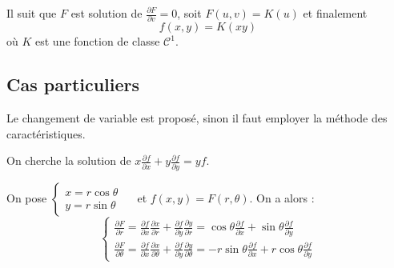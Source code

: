 \documentclass[12pt]{article}
\newcounter{exercice}
\begin{document}
Il suit que $F$ est solution de $\frac{\partial F}{\partial v} = 0$, soit $F(u, v) = K(u)$ et finalement
$$
f(x, y) = K(xy)
$$
où $K$ est une fonction de classe $\mathcal{C}^{1}$.

\subsection{Cas particuliers}

Le changement de variable est proposé, sinon il faut employer la méthode des caractéristiques.

\begin{exercice}
On cherche la solution de $x \frac{\partial f}{\partial x} + y \frac{\partial f}{\partial y} = yf$.
\end{exercice}

\begin{corrige}
On pose $\left\{\begin{array}{l}x = r \cos \theta \\ y = r \sin \theta\end{array} \quad\right.$ et $f(x, y) = F(r, \theta)$. On a alors :
$$
\left\{\begin{array}{l}
\frac{\partial F}{\partial r} = \frac{\partial f}{\partial x} \frac{\partial x}{\partial r} + \frac{\partial f}{\partial y} \frac{\partial y}{\partial r} = \cos \theta \frac{\partial f}{\partial x} + \sin \theta \frac{\partial f}{\partial y} \\
\frac{\partial F}{\partial \theta} = \frac{\partial f}{\partial x} \frac{\partial x}{\partial \theta} + \frac{\partial f}{\partial y} \frac{\partial y}{\partial \theta} = -r \sin \theta \frac{\partial f}{\partial x} + r \cos \theta \frac{\partial f}{\partial y}
\end{array}\right.
$$


\end{corrige}
\end{document}
